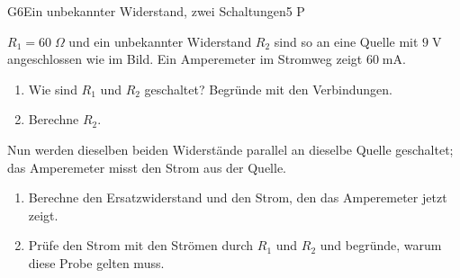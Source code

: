 \documentclass[11pt]{article}
\begin{document}
\begin{lpaufgabe}{G6}{Ein unbekannter Widerstand, zwei Schaltungen}{5 P}
\begin{minipage}[t]{0.56\linewidth}\vspace{0pt}
$R_1 = 60\;\Omega$ und ein unbekannter Widerstand $R_2$ sind so an eine Quelle mit $9\;\text{V}$ angeschlossen wie im Bild.
Ein Amperemeter im Stromweg zeigt $60\;\text{mA}$.
\begin{enumerate}[label=\alph*),leftmargin=*,itemsep=2pt,topsep=2pt]
\item Wie sind $R_1$ und $R_2$ geschaltet? Begründe mit den Verbindungen.
\item Berechne $R_2$.
\end{enumerate}
Nun werden dieselben beiden Widerstände parallel an dieselbe Quelle geschaltet; das Amperemeter misst den Strom aus der Quelle.
\begin{enumerate}[label=\alph*),leftmargin=*,itemsep=2pt,topsep=2pt,start=3]
\item Berechne den Ersatzwiderstand und den Strom, den das Amperemeter jetzt zeigt.
\item Prüfe den Strom mit den Strömen durch $R_1$ und $R_2$ und begründe, warum diese Probe gelten muss.
\end{enumerate}
\end{minipage}\hfill
\begin{minipage}[t]{0.4\linewidth}\vspace{4pt}\centering
{}
\end{minipage}
\end{lpaufgabe}

\end{document}
